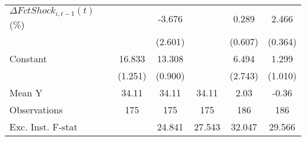 {\begin{tabular}{l*{5}{c}}
\addlinespace
$ \Delta FctShock_{i,t-1}(t)$ (\%)&                     &      -3.676         &                     &       0.289         &       2.466\sym{***}\\
                    &                     &     (2.601)         &                     &     (0.607)         &     (0.364)         \\
\addlinespace
Constant            &      16.833\sym{***}&      13.308\sym{***}&                     &       6.494\sym{**} &       1.299         \\
                    &     (1.251)         &     (0.900)         &                     &     (2.743)         &     (1.010)         \\
\midrule
Mean Y              &       34.11         &       34.11         &       34.11         &        2.03         &       -0.36         \\
Observations        &         175         &         175         &         175         &         186         &         186         \\
Exc. Inst. F-stat   &                     &      24.841         &      27.543         &      32.047         &      29.566         \\
\bottomrule
\end{tabular}
}

